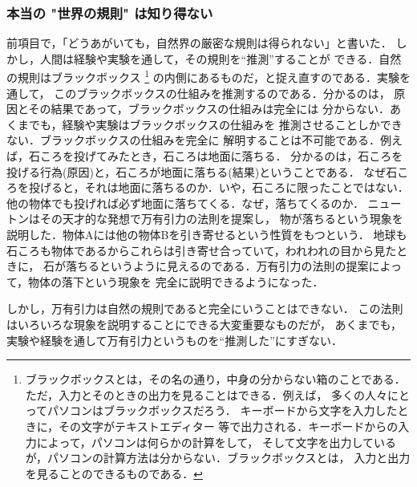             \subsubsection{本当の "世界の規則" は知り得ない}
                前項目で，「どうあがいても，自然界の厳密な規則は得られない」と書いた．
                しかし，人間は経験や実験を通して，その規則を“推測”することが
                できる．自然の規則はブラックボックス
                    \footnote{
                        ブラックボックスとは，その名の通り，中身の分からない箱のことである．
                        ただ，入力とそのときの出力を見ることはできる．例えば，
                        多くの人々にとってパソコンはブラックボックスだろう．
                        キーボードから文字を入力したときに，その文字がテキストエディター
                        等で出力される．キーボードからの入力によって，パソコンは何らかの計算をして，
                        そして文字を出力しているが，パソコンの計算方法は分からない．ブラックボックスとは，
                        入力と出力を見ることのできるものである．
                    }
                の内側にあるものだ，と捉え直すのである．実験を通して，
                このブラックボックスの仕組みを推測するのである．分かるのは，
                原因とその結果であって，ブラックボックスの仕組みは完全には
                分からない．あくまでも，経験や実験はブラックボックスの仕組みを
                推測させることしかできない．ブラックボックスの仕組みを完全に
                解明することは不可能である．例えば，石ころを投げてみたとき，石ころは地面に落ちる．
                分かるのは，石ころを投げる行為(原因)と，石ころが地面に落ちる(結果)ということである．
                なぜ石ころを投げると，それは地面に落ちるのか．いや，石ころに限ったことではない．
                他の物体でも投げれば必ず地面に落ちてくる．なぜ，落ちてくるのか．
                ニュートンはその天才的な発想で万有引力の法則を提案し，
                物が落ちるという現象を説明した．物体Aには他の物体Bを引き寄せるという性質をもつという．
                地球も石ころも物体であるからこれらは引き寄せ合っていて，われわれの目から見たときに，
                石が落ちるというように見えるのである．万有引力の法則の提案によって，物体の落下という現象を
                完全に説明できるようになった．

                しかし，万有引力は自然の規則であると完全にいうことはできない．
                この法則はいろいろな現象を説明することにできる大変重要なものだが，
                あくまでも，実験や経験を通して万有引力というものを“推測した”にすぎない．

